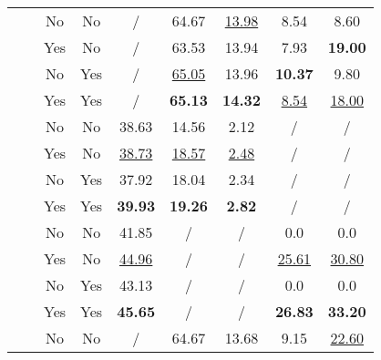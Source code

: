 \begin{table*}[h!]
{\begin{tabular}{c c c c c c c c c}
                                           &  & No & No & /& 64.67& \underline{13.98}& 8.54& 8.60\\  
                                                                           &             & Yes &No & /& 63.53& 13.94& 7.93& \textbf{19.00}\\   
                                                                           &             & No & Yes & /& \underline{65.05}& 13.96& \textbf{10.37}& 9.80\\   
                                                                           &             & Yes & Yes & /& \textbf{65.13}& \textbf{14.32}& \underline{8.54}& \underline{18.00}\\ \hline
{} &  & No & No & 38.63& 14.56& 2.12& / & / \\  
                                                                         &                       & Yes & No & \underline{38.73}& \underline{18.57}& \underline{2.48}& / & / \\   
                                                                         &                       & No & Yes & 37.92& 18.04& 2.34& / & / \\  
                                                                         &                       & Yes & Yes & \textbf{39.93}& \textbf{19.26}& \textbf{2.82}& / & /\\ 
                                           &  & No & No &  41.85& /& /& 0.0 & 0.0\\  
                                                                         &             & Yes & No & \underline{44.96}& /& /& \underline{25.61}& \underline{30.80}\\   
                                                                         &             & No & Yes & 43.13& /& /& 0.0& 0.0\\   
                                                                         &             & Yes & Yes & \textbf{45.65}& /& /& \textbf{26.83}& \textbf{33.20}\\ 
                                           &  & No & No & / & 64.67 & 13.68 & 9.15 & \underline{22.60} \\  

\end{tabular}}
\end{table*}
